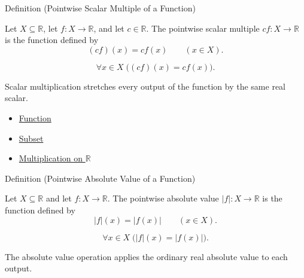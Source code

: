 \begin{definitionbox}{Definition (Pointwise Scalar Multiple of a Function)}
\begin{definition}
\label{def:pointwise-scalar-multiple-of-a-function}
Let $X\subseteq\mathbb{R}$, let $f:X\to\mathbb{R}$, and let
$c\in\mathbb{R}$.  The pointwise scalar multiple $cf:X\to\mathbb{R}$ is
the function defined by
\[
  (cf)(x)=c f(x)
  \qquad (x\in X).
\]
\end{definition}
\end{definitionbox}

\begin{remark*}
\[
  \forall x\in X\;\bigl((cf)(x)=c f(x)\bigr).
\]
\end{remark*}

\begin{remark*}[Interpretation]
Scalar multiplication stretches every output of the function by the same
real scalar.
\end{remark*}

\begin{dependencies}
\begin{itemize}
  \item \hyperref[def:function]{Function}
  \item \hyperref[def:subset]{Subset}
  \item \hyperref[def:multiplication-on-r]{Multiplication on $\mathbb{R}$}
\end{itemize}
\end{dependencies}

\begin{definitionbox}{Definition (Pointwise Absolute Value of a Function)}
\begin{definition}
\label{def:pointwise-absolute-value-of-a-function}
Let $X\subseteq\mathbb{R}$ and let $f:X\to\mathbb{R}$.  The pointwise
absolute value $|f|:X\to\mathbb{R}$ is the function defined by
\[
  |f|(x)=|f(x)|
  \qquad (x\in X).
\]
\end{definition}
\end{definitionbox}

\begin{remark*}
\[
  \forall x\in X\;\bigl(|f|(x)=|f(x)|\bigr).
\]
\end{remark*}

\begin{remark*}[Interpretation]
The absolute value operation applies the ordinary real absolute value to
each output.
\end{remark*}

